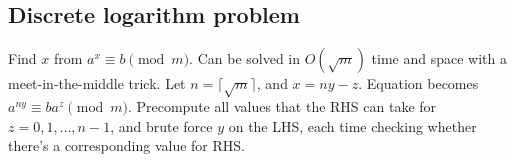 \documentclass[12pt]{extarticle}
\begin{document}
\begin{multicols*}{2}





\subsection{Discrete logarithm problem}  Find $x$ from $a^x \equiv b \pmod{m}$.
Can be solved in $O(\sqrt{m})$ time and space with a meet-in-the-middle trick.
Let $n = \lceil \sqrt{m} \rceil$, and $x = ny - z$.
Equation becomes $a^{ny} \equiv b a^z \pmod{m}$.  Precompute all values that
the RHS can take for $z = 0, 1, \dots, n-1$, and brute force $y$ on the LHS,
each time checking whether there's a corresponding value for RHS.



\end{multicols*}
\end{document}

